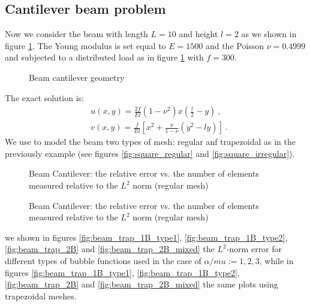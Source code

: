 \documentclass[preprint,12pt,authoryear]{elsarticle}
\begin{document}
\subsection{Cantilever beam problem}
Now we consider the beam with length $L=10$ and height $l=2$ as we shown in figure \ref{fig:beam_geometry}. The Young modulus is set equal to $E=1500$ and the Poisson $\nu=0.4999$ and subjected to a distributed load as in figure \ref{fig:beam_geometry} with $f=300$.
%
\begin{figure}[h!]
\begin{center}

\caption{Beam cantilever geometry \label{fig:beam_geometry}}
\end{center}
\end{figure}
%
The exact solution is:
\begin{equation}
\begin{split}
&u(x,y) = \frac{2 f}{E l} (1-\nu^{2}) x \left( \frac{l}{2} - y \right)\: , \\
&v(x,y) = \frac{f}{E l} \left[ x^{2} + \frac{\nu}{1-\nu}\left(y^{2}-l y 
\right) \right] \: .
\end{split}
\end{equation}
We use to model the beam two types of mesh: regular anf trapezoidal as in the previously example (see figures \ref{fig:square_regular} and \ref{fig:square_irregular}).
%
\begin{figure}[h!]
\begin{center}
\caption{Beam Cantilever: the relative error vs. the number of elements measured relative to the $L^{2}$ norm (regular mesh)}
\end{center}
\end{figure}
%
\begin{figure}[h!]
\begin{center}
\caption{Beam Cantilever: the relative error vs. the number of elements measured relative to the $L^{2}$ norm (regular mesh)} 
\end{center}
\end{figure}
we shown in figures \ref{fig:beam_trap_1B_type1}, \ref{fig:beam_trap_1B_type2}, \ref{fig:beam_trap_2B} and \ref{fig:beam_trap_2B_mixed} the $L^{2}$-norm error for different types of bubble functions used in the case of $\alpha/mu:={1,2,3}$, while in figures \ref{fig:beam_trap_1B_type1}, \ref{fig:beam_trap_1B_type2}, \ref{fig:beam_trap_2B} and \ref{fig:beam_trap_2B_mixed} the same plots using trapezoidal meshes.
\end{document}
